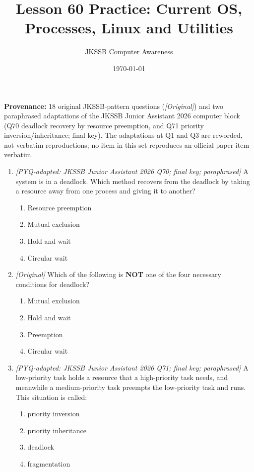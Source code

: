 \documentclass[11pt]{article}
\title{Lesson 60 Practice: Current OS, Processes, Linux and Utilities}
\author{JKSSB Computer Awareness}
\date{\today}
\begin{document}
\maketitle
\noindent\textbf{Provenance:} 18 original JKSSB-pattern questions
(\textit{[Original]}) and two paraphrased adaptations of the JKSSB Junior
Assistant 2026 computer block (Q70 deadlock recovery by resource preemption,
and Q71 priority inversion/inheritance; final key). The adaptations at Q1 and
Q3 are reworded, not verbatim reproductions; no item in this set reproduces an
official paper item verbatim.

\begin{enumerate}[label=\textbf{Q\arabic*.}, leftmargin=*]
\item \textit{[PYQ-adapted: JKSSB Junior Assistant 2026 Q70; final key;
  paraphrased]} A system is in a deadlock. Which method recovers from the
  deadlock by taking a resource away from one process and giving it to
  another?
  \begin{enumerate}[label=\Alph*.]
    \item Resource preemption
    \item Mutual exclusion
    \item Hold and wait
    \item Circular wait
  \end{enumerate}
\item \textit{[Original]} Which of the following is \textbf{NOT} one of the
  four necessary conditions for deadlock?
  \begin{enumerate}[label=\Alph*.]
    \item Mutual exclusion
    \item Hold and wait
    \item Preemption
    \item Circular wait
  \end{enumerate}
\item \textit{[PYQ-adapted: JKSSB Junior Assistant 2026 Q71; final key;
  paraphrased]} A low-priority task holds a resource that a high-priority
  task needs, and meanwhile a medium-priority task preempts the low-priority
  task and runs. This situation is called:
  \begin{enumerate}[label=\Alph*.]
    \item priority inversion
    \item priority inheritance
    \item deadlock
    \item fragmentation
  \end{enumerate}

\end{enumerate}
\end{document}
